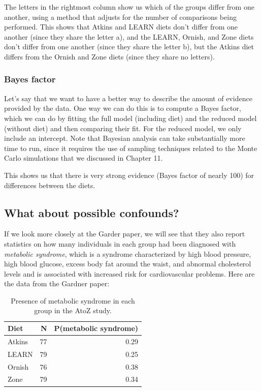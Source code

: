 \documentclass[12pt,]{book}
\theoremstyle{definition}
\theoremstyle{definition}
\theoremstyle{definition}
\theoremstyle{remark}
\begin{document}
The letters in the rightmost column show us which of the groups differ from one another, using a method that adjusts for the number of comparisons being performed. This shows that Atkins and LEARN diets don't differ from one another (since they share the letter a), and the LEARN, Ornish, and Zone diets don't differ from one another (since they share the letter b), but the Atkins diet differs from the Ornish and Zone diets (since they share no letters).

\hypertarget{bayes-factor-1}{%
\subsubsection{Bayes factor}\label{bayes-factor-1}}

Let's say that we want to have a better way to describe the amount of evidence provided by the data. One way we can do this is to compute a Bayes factor, which we can do by fitting the full model (including diet) and the reduced model (without diet) and then comparing their fit. For the reduced model, we only include an intercept. Note that Bayesian analysis can take substantially more time to run, since it requires the use of sampling techniques related to the Monte Carlo simulations that we discussed in Chapter 11.

This shows us that there is very strong evidence (Bayes factor of nearly 100) for differences between the diets.

\hypertarget{what-about-possible-confounds}{%
\subsection{What about possible confounds?}\label{what-about-possible-confounds}}

If we look more closely at the Garder paper, we will see that they also report statistics on how many individuals in each group had been diagnosed with \emph{metabolic syndrome}, which is a syndrome characterized by high blood pressure, high blood glucose, excess body fat around the waist, and abnormal cholesterol levels and is associated with increased risk for cardiovascular problems. Here are the data from the Gardner paper:

\begin{table}

\caption{\label{tab:unnamed-chunk-134}Presence of metabolic syndrome in each group in the AtoZ study.}
\centering
\begin{tabular}[t]{l|r|r}
\hline
Diet & N & P(metabolic syndrome)\\
\hline
Atkins & 77 & 0.29\\
\hline
LEARN & 79 & 0.25\\
\hline
Ornish & 76 & 0.38\\
\hline
Zone & 79 & 0.34\\
\hline
\end{tabular}
\end{table}
\end{document}
